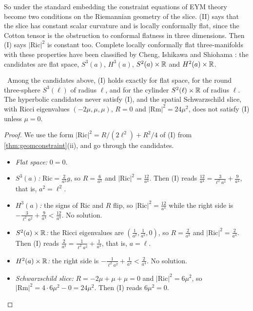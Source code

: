 So under the standard embedding the constraint equations of EYM theory become two conditions on the Riemannian geometry of the slice. (II) says that the slice has constant scalar curvature and is locally conformally flat, since the Cotton tensor is the obstruction to conformal flatness in three dimensions. Then (I) says $|\mathrm{Ric}|^2$ is constant too. Complete locally conformally flat three-manifolds with these properties have been classified by Cheng, Ishikawa and Shiohama \cite{CIS1999} \ext: the candidates are flat space, $S^3(a)$, $H^3(a)$, $S^2(a)\times\mathbb{R}$ and $H^2(a)\times\mathbb{R}$.

\begin{theorem}\label{thm:threesol}\ver\
Among the candidates above, (I) holds exactly for flat space, for the round three-sphere $S^3(\ell)$ of radius $\ell$, and for the cylinder $S^2(\ell)\times\mathbb{R}$ of radius $\ell$. The hyperbolic candidates never satisfy (I), and the spatial Schwarzschild slice, with Ricci eigenvalues $(-2\mu,\mu,\mu)$, $R=0$ and $|\mathrm{Rm}|^2=24\mu^2$, does not satisfy (I) unless $\mu=0$.
\end{theorem}
\begin{proof}
We use the form $|\mathrm{Ric}|^2=R/(2\ell^2)+R^2/4$ of (I) from \cref{thm:geomconstraint}(ii), and go through the candidates.
\begin{itemize}
\item \emph{Flat space:} $0=0$.
\item \emph{$S^3(a)$:} $\mathrm{Ric}=\frac2{a^2}g$, so $R=\frac6{a^2}$ and $|\mathrm{Ric}|^2=\frac{12}{a^4}$. Then (I) reads $\frac{12}{a^4}=\frac3{\ell^2a^2}+\frac9{a^4}$, that is, $a^2=\ell^2$.
\item \emph{$H^3(a)$:} the signs of $\mathrm{Ric}$ and $R$ flip, so $|\mathrm{Ric}|^2=\frac{12}{a^4}$ while the right side is $-\frac3{\ell^2a^2}+\frac9{a^4}<\frac{12}{a^4}$. No solution.
\item \emph{$S^2(a)\times\mathbb{R}$:} the Ricci eigenvalues are $(\frac1{a^2},\frac1{a^2},0)$, so $R=\frac2{a^2}$ and $|\mathrm{Ric}|^2=\frac2{a^4}$. Then (I) reads $\frac2{a^4}=\frac1{\ell^2a^2}+\frac1{a^4}$, that is, $a=\ell$.
\item \emph{$H^2(a)\times\mathbb{R}$:} the right side is $-\frac1{\ell^2a^2}+\frac1{a^4}<\frac2{a^4}$. No solution.
\item \emph{Schwarzschild slice:} $R=-2\mu+\mu+\mu=0$ and $|\mathrm{Ric}|^2=6\mu^2$, so $|\mathrm{Rm}|^2=4\cdot6\mu^2-0=24\mu^2$. Then (I) reads $6\mu^2=0$.\qedhere
\end{itemize}
\end{proof}


